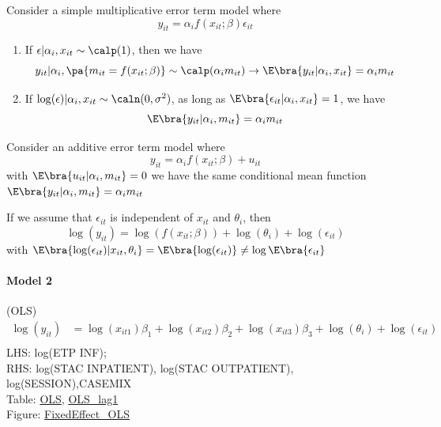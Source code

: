 \begin{example}
    Consider a simple multiplicative error term model where \begin{equation*}
        y_{it}=\alpha_i f(x_{it};\beta)\epsilon_{it}
    \end{equation*}
    \begin{enumerate}
        \item If $\epsilon|\alpha_i,x_{it}\sim \calp(1)$, then we have \begin{equation*}
                  y_{it} | \alpha_i,\pa{m_{it}= f(x_{it};\beta)}\sim \calp(\alpha_i m_{it}) \to \E\bra{y_{it}|\alpha_i,x_{it}}=\alpha_i m_{it}
              \end{equation*}
        \item If $\log(\epsilon)|\alpha_i,x_{it}\sim \caln(0,\sigma^2)$, as long as
              $\E\bra{\epsilon_{it}|\alpha_i,x_{it}}=1$, we have \begin{equation*}
                  \E\bra{y_{it} | \alpha_i,m_{it}}=\alpha_i m_{it}
              \end{equation*}
    \end{enumerate}
    Consider an additive error term model where \begin{equation*}
        y_{it} = \alpha_i f(x_{it};\beta)+u_{it}
    \end{equation*} with $\E\bra{u_{it}|\alpha_i, m_{it}}=0$ we have the same conditional mean function $\E\bra{y_{it}|\alpha_i,m_{it}}=\alpha_i m_{it}$

\end{example}

\begin{remark}
    If we assume that $\epsilon_{it}$ is independent of $x_{it}$ and $\theta_i$, then \begin{equation*}
        \log(y_{it})=\log(f(x_{it};\beta))+\log(\theta_i)+\log(\epsilon_{it})
    \end{equation*}
    with $\E\bra{\log(\epsilon_{it})|x_{it},\theta_i}=\E\bra{\log(\epsilon_{it})}\neq \log\E\bra{\epsilon_{it}}$
\end{remark}

\paragraph{Model 2} (OLS)
\begin{align*}
    \log(y_{it}) & =\log(x_{it1})\beta_1+\log(x_{it2})\beta_2+\log(x_{it3})\beta_3+\log(\theta_i)+\log(\epsilon_{it}) \\
\end{align*}
LHS: log(ETP INF); \\ RHS: log(STAC INPATIENT), log(STAC OUTPATIENT),
log(SESSION),CASEMIX
\\Table: \hyperlink{reg_inf_ols_2022}{OLS},
\hyperlink{reg_inf_lag_2022}{OLS\_lag1}
\\Figure: \hyperlink{FE_OLS_FI}{FixedEffect\_OLS}

